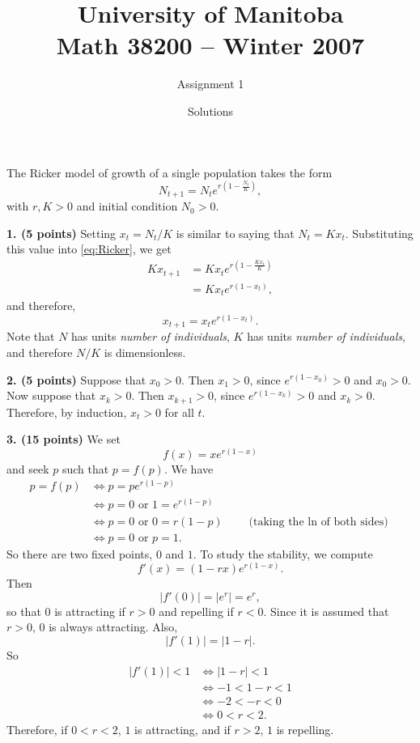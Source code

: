\documentclass[12pt]{article}
\title{University of Manitoba\\ Math 38200 -- Winter 2007}
\author{Assignment 1}
\date{Solutions}
\theoremstyle{plain}
\begin{document}
\maketitle

\vskip1cm
\noindent
The Ricker model of growth of a single population takes the form
\begin{equation}\label{eq:Ricker}
N_{t+1}=N_t e^{r\left(1-\frac{N_t}K\right)},
\end{equation}
with $r,K>0$ and initial condition $N_0>0$.

\vskip1cm
\noindent
{\bf 1. (5 points)} 
Setting $x_t=N_t/K$ is similar to saying that $N_t=Kx_t$. Substituting this value into \eqref{eq:Ricker}, we get
\begin{align*}
Kx_{t+1} &= Kx_t e^{r\left(1-\frac{Kx_t}K\right)} \\
&= Kx_t e^{r(1-x_t)},
\end{align*}
and therefore,
\begin{equation}\label{eq:Ricker_dimless}
x_{t+1}=x_t e^{r(1-x_t)}.
\end{equation}
Note that $N$ has units \emph{number of individuals}, $K$ has units \emph{number of individuals}, and therefore $N/K$ is dimensionless.

\vskip0.4cm
\noindent
{\bf 2. (5 points)} 
Suppose that $x_0>0$. Then $x_1>0$, since $e^{r(1-x_0)}>0$ and $x_0>0$. Now suppose that $x_k>0$. Then $x_{k+1}>0$, since $e^{r(1-x_k)}>0$ and $x_k>0$. Therefore, by induction, $x_t>0$ for all $t$.

\vskip0.4cm
\noindent
{\bf 3. (15 points)} 
We set
\[
f(x)=xe^{r(1-x)}
\]
and seek $p$ such that $p=f(p)$. We have
\begin{align*}
p=f(p) &\Leftrightarrow p=pe^{r(1-p)} \\
&\Leftrightarrow p=0\textrm{ or }1=e^{r(1-p)} \\
&\Leftrightarrow p=0\textrm{ or }0=r(1-p)\qquad\textrm{(taking the $\ln$ of both sides)} \\
&\Leftrightarrow p=0\textrm{ or }p=1.
\end{align*}
So there are two fixed points, $0$ and $1$. To study the stability, we compute
\[
f'(x)=(1-rx)e^{r(1-x)}.
\]
Then
\[
|f'(0)|=|e^r|=e^r,
\]
so that $0$ is attracting if $r>0$ and repelling if $r<0$. Since it is assumed that $r>0$, $0$ is always attracting.
Also,
\[
|f'(1)|=|1-r|.
\]
So
\begin{align*}
|f'(1)|<1 &\Leftrightarrow |1-r|<1 \\
&\Leftrightarrow -1<1-r<1 \\
&\Leftrightarrow -2<-r<0 \\
&\Leftrightarrow 0<r<2.
\end{align*}
Therefore, if $0<r<2$, $1$ is attracting, and if $r>2$, $1$ is repelling.
\end{document}
